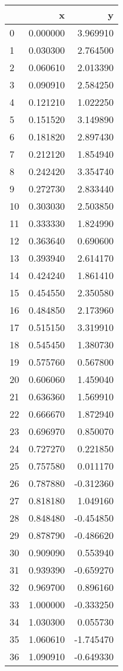 \begin{tabular}{lrr}
\toprule
 & x  &  y \\
\midrule
0 & 0.000000 & 3.969910 \\
1 & 0.030300 & 2.764500 \\
2 & 0.060610 & 2.013390 \\
3 & 0.090910 & 2.584250 \\
4 & 0.121210 & 1.022250 \\
5 & 0.151520 & 3.149890 \\
6 & 0.181820 & 2.897430 \\
7 & 0.212120 & 1.854940 \\
8 & 0.242420 & 3.354740 \\
9 & 0.272730 & 2.833440 \\
10 & 0.303030 & 2.503850 \\
11 & 0.333330 & 1.824990 \\
12 & 0.363640 & 0.690600 \\
13 & 0.393940 & 2.614170 \\
14 & 0.424240 & 1.861410 \\
15 & 0.454550 & 2.350580 \\
16 & 0.484850 & 2.173960 \\
17 & 0.515150 & 3.319910 \\
18 & 0.545450 & 1.380730 \\
19 & 0.575760 & 0.567800 \\
20 & 0.606060 & 1.459040 \\
21 & 0.636360 & 1.569910 \\
22 & 0.666670 & 1.872940 \\
23 & 0.696970 & 0.850070 \\
24 & 0.727270 & 0.221850 \\
25 & 0.757580 & 0.011170 \\
26 & 0.787880 & -0.312360 \\
27 & 0.818180 & 1.049160 \\
28 & 0.848480 & -0.454850 \\
29 & 0.878790 & -0.486620 \\
30 & 0.909090 & 0.553940 \\
31 & 0.939390 & -0.659270 \\
32 & 0.969700 & 0.896160 \\
33 & 1.000000 & -0.333250 \\
34 & 1.030300 & 0.055730 \\
35 & 1.060610 & -1.745470 \\
36 & 1.090910 & -0.649330 \\

\end{tabular}
